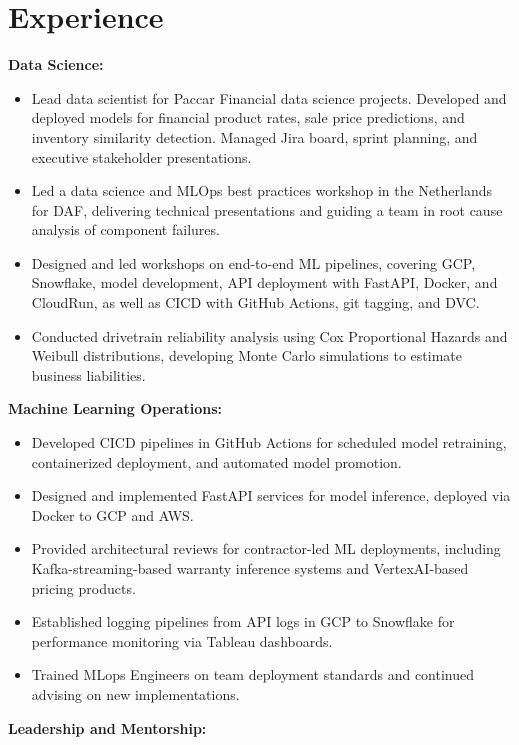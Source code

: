 \documentclass[12pt,a4paper]{moderncv}
\begin{document}
\section{Experience}
\item \textbf{Data Science:}
\begin{itemize}
    \item Lead data scientist for Paccar Financial data science projects. Developed and deployed models for financial product rates, sale price predictions, and inventory similarity detection. Managed Jira board, sprint planning, and executive stakeholder presentations.
    \item Led a data science and MLOps best practices workshop in the Netherlands for DAF, delivering technical presentations and guiding a team in root cause analysis of component failures.
    \item Designed and led workshops on end-to-end ML pipelines, covering GCP, Snowflake, model development, API deployment with FastAPI, Docker, and CloudRun, as well as CICD with GitHub Actions, git tagging, and DVC.
    \item Conducted drivetrain reliability analysis using Cox Proportional Hazards and Weibull distributions, developing Monte Carlo simulations to estimate business liabilities.
\end{itemize}
\item \textbf{Machine Learning Operations:}
\begin{itemize}
    \item Developed CICD pipelines in GitHub Actions for scheduled model retraining, containerized deployment, and automated model promotion.
    \item Designed and implemented FastAPI services for model inference, deployed via Docker to GCP and AWS.
    \item Provided architectural reviews for contractor-led ML deployments, including Kafka-streaming-based warranty inference systems and VertexAI-based pricing products.
    \item Established logging pipelines from API logs in GCP to Snowflake for performance monitoring via Tableau dashboards.
    \item Trained MLops Engineers on team deployment standards and continued advising on new implementations.
\end{itemize}
\item \textbf{Leadership and Mentorship:}
\end{document}
